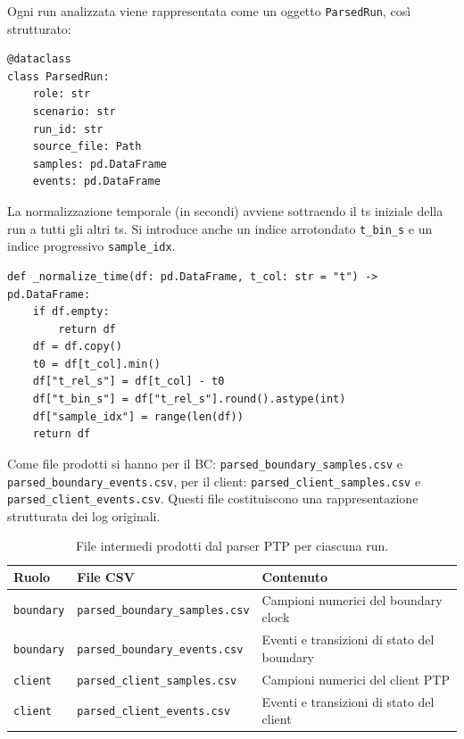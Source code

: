 Ogni run analizzata viene rappresentata come un oggetto
\texttt{ParsedRun}, così strutturato:

\begin{listing}[H]
\begin{verbatim}
@dataclass
class ParsedRun:
    role: str
    scenario: str
    run_id: str
    source_file: Path
    samples: pd.DataFrame
    events: pd.DataFrame
\end{verbatim}
\caption{Struttura dati utilizzata per rappresentare una run PTP parsata.}
\label{lst:ptp-parsedrun}
\end{listing}

La normalizzazione temporale (in secondi) avviene sottraendo il ts iniziale della run a 
tutti gli altri ts. Si introduce anche un indice arrotondato \texttt{t\_bin\_s} 
e un indice progressivo \texttt{sample\_idx}.

\begin{listing}[H]
\begin{verbatim}
def _normalize_time(df: pd.DataFrame, t_col: str = "t") -> pd.DataFrame:
    if df.empty:
        return df
    df = df.copy()
    t0 = df[t_col].min()
    df["t_rel_s"] = df[t_col] - t0
    df["t_bin_s"] = df["t_rel_s"].round().astype(int)
    df["sample_idx"] = range(len(df))
    return df
\end{verbatim}
\caption{Normalizzazione temporale dei campioni e degli eventi PTP.}
\label{lst:ptp-normalize-time}
\end{listing}

Come file prodotti si hanno per il BC: 
\texttt{parsed\_boundary\_samples.csv} e
\texttt{parsed\_boundary\_events.csv}, per il client:
\texttt{parsed\_client\_samples.csv} e \texttt{parsed\_client\_events.csv}.
Questi file costituiscono una rappresentazione strutturata dei log originali.

\begin{table}[H]
  \centering
  \begin{tabular}{lll}
    \hline
    \textbf{Ruolo} & \textbf{File CSV} & \textbf{Contenuto} \\
    \hline
    \texttt{boundary} & \texttt{parsed\_boundary\_samples.csv} & Campioni numerici del boundary clock \\
    \texttt{boundary} & \texttt{parsed\_boundary\_events.csv} & Eventi e transizioni di stato del boundary \\
    \texttt{client} & \texttt{parsed\_client\_samples.csv} & Campioni numerici del client PTP \\
    \texttt{client} & \texttt{parsed\_client\_events.csv} & Eventi e transizioni di stato del client \\
    \hline
  \end{tabular}
  \caption{File intermedi prodotti dal parser PTP per ciascuna run.}
  \label{tab:ptp-csv-per-run}
\end{table}


